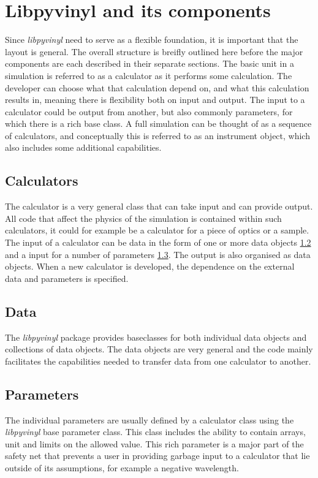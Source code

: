 \documentclass[10pt]{scrartcl}
\begin{document}
\section{Libpyvinyl and its components}
\label{sec:libpyvinyl}
Since \textit{libpyvinyl} need to serve as a flexible foundation, it is
important that the layout is general. The overall structure is breifly outlined
here before the major components are each described in their separate sections.
The basic unit in a simulation is referred to as a calculator as it performs
some calculation. The developer can choose what that calculation depend on, and
what this calculation results in, meaning there is flexibility both on input and
output. The input to a calculator could be output from another, but also
commonly parameters, for which there is a rich base class. A full simulation can
be thought of as a sequence of calculators, and conceptually this is referred to
as an instrument object, which also includes some additional capabilities.

\subsection{Calculators}
\label{sec:calculators}
The calculator is a very general class that can take input and can provide
output. All code that affect the physics of the simulation is contained within
such calculators, it could for example be a calculator for a piece of optics or
a sample. The input of a calculator can be data in the form of one or more data
objects \ref{sec:data} and a input for a number of parameters
\ref{sec:parameters}. The output is also organised as data objects. When a new
calculator is developed, the dependence on the external data and parameters is
specified.

\subsection{Data}
\label{sec:data}
The \textit{libpyvinyl} package provides baseclasses for both individual data
objects and collections of data objects. The data objects are very general and
the code mainly facilitates the capabilities needed to transfer data from one
calculator to another.

\subsection{Parameters}
\label{sec:parameters}
The individual parameters are usually defined by a calculator class using the
\textit{libpyvinyl} base parameter class. This class includes the ability to
contain arrays, unit and limits on the allowed value. This rich parameter is a
major part of the safety net that prevents a user in providing garbage input to
a calculator that lie outside of its assumptions, for example a negative
wavelength.
\end{document}
